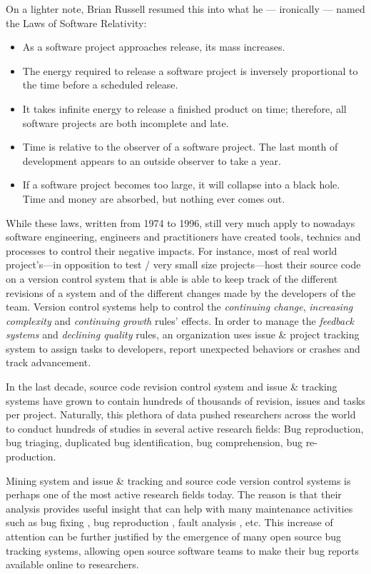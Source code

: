 On a lighter note, Brian Russell resumed this into what he --- ironically --- named the Laws of Software Relativity:

\begin{itemize}
\item As a software project approaches release, its mass increases.
\item The energy required to release a software project is inversely proportional to the time before a scheduled release.
\item It takes infinite energy to release a finished product on time; therefore, all software projects are both incomplete and late.
\item Time is relative to the observer of a software project. The last month of development appears to an outside observer to take a year.
\item If a software project becomes too large, it will collapse into a black hole. Time and money are absorbed, but nothing ever comes out.
\end{itemize}

While these laws, written from 1974 to 1996, still very much apply to nowadays software engineering, engineers and practitioners have created tools, technics and processes to control their negative impacts.
For instance, most of real world project's---in opposition to test / very small size projects---host their source code on a version control system \cite{rochkind1975source} that is able is able to keep track of the different revisions of a system and of the different changes made by the developers of the team.
Version control systems help to control the {\it continuing change}, {\it increasing complexity} and {\it continuing growth} rules' effects.
In order to manage the {\it feedback systems} and {\it declining quality} rules, an organization uses issue \& project tracking system to assign tasks to developers, report unexpected behaviors or crashes and track advancement.

In the last decade, source code revision control system and issue \& tracking systems have grown to contain hundreds of thousands of revision, issues and tasks per project.
Naturally, this plethora of data pushed researchers across the world to conduct hundreds of studies in several active research fields: Bug reproduction, bug triaging, duplicated bug identification, bug comprehension, bug re-production.

Mining system and issue \& tracking and source code version control systems is perhaps one of the most active research fields today. The reason is that their analysis provides useful insight that can help with many maintenance activities such as bug fixing \cite{Weiss2007,Saha2014}, bug reproduction \cite{Artzi2008,Jin2012,Chen2013}, fault analysis \cite{Jiang2012,Jin2013}, etc. This increase of attention can be further justified by the emergence of many open source bug tracking systems, allowing open source software teams to make their bug reports available online to researchers.

